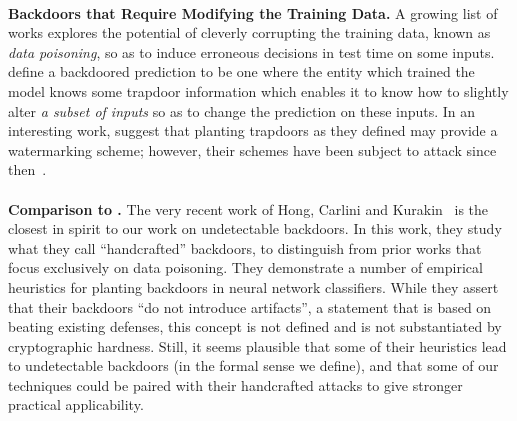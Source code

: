 \documentclass[preprint,11pt]{elsarticle}
\begin{document}
\paragraph{} 
\textbf{Backdoors that Require Modifying the Training Data.} A growing list of works \cite{CLLLS17, TLM18, ohSPECTRE2021}
explores the potential  of cleverly corrupting the training data, known as \emph{data poisoning}, so as to induce erroneous decisions in test time on some inputs.
\cite{GLDG19} define a backdoored prediction to be one where the entity which trained the model knows some trapdoor information which enables it to know how to slightly alter {\it a subset of inputs} so as to change the prediction on these inputs. 
In an interesting work, \cite{ABCPK18} suggest that planting trapdoors as they defined may provide a watermarking scheme; however, their schemes have been subject to attack since then~\cite{SWLK19}.

\paragraph{}
\textbf{Comparison to \cite{hong2021handcrafted}.} The very recent work of Hong, Carlini and Kurakin~\cite{hong2021handcrafted} is the closest in spirit to our work on undetectable backdoors.
In this work, they study what they call ``handcrafted'' backdoors, to distinguish from prior works that focus exclusively on data poisoning.
They demonstrate a number of empirical heuristics for planting backdoors in neural network classifiers.
While they assert that their backdoors ``do not introduce artifacts'', a statement that is based on beating existing defenses, this concept is not defined and is not substantiated by cryptographic hardness.
Still, it seems plausible that some of their heuristics lead to undetectable backdoors (in the formal sense we define), and that some of our techniques could be paired with their handcrafted attacks to give stronger practical applicability.
\end{document}

